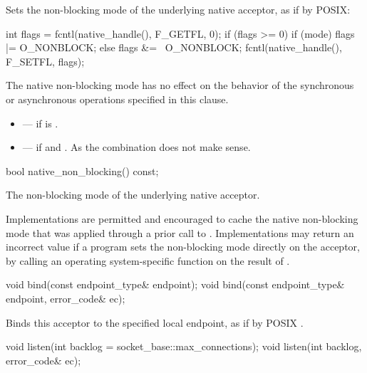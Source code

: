 \begin{itemdescr}
\pnum
\effects Sets the non-blocking mode of the underlying native acceptor, as if by POSIX: 
\begin{codeblock}
int flags = fcntl(native_handle(), F_GETFL, 0);
if (flags >= 0)
{
  if (mode)
    flags |= O_NONBLOCK;
  else
    flags &= ~O_NONBLOCK;
  fcntl(native_handle(), F_SETFL, flags);
}
\end{codeblock}


\pnum
 The native non-blocking mode has no effect on the behavior of the synchronous or asynchronous operations specified in this clause.

\pnum
\errors
\begin{itemize}
\item
{} --- if  is .
\item
{} --- if  and . \enternote As the combination does not make sense. \exitnote
\end{itemize}
\end{itemdescr}

\begin{itemdecl}
bool native_non_blocking() const;
\end{itemdecl}

\begin{itemdescr}
\pnum
\returns The non-blocking mode of the underlying native acceptor.

\pnum
\remarks Implementations are permitted and encouraged to cache the native non-blocking mode that was applied through a prior call to . Implementations may return an incorrect value if a program sets the non-blocking mode directly on the acceptor, by calling an operating system-specific function on the result of .
\end{itemdescr}

\begin{itemdecl}
void bind(const endpoint_type& endpoint);
void bind(const endpoint_type& endpoint, error_code& ec);
\end{itemdecl}

\begin{itemdescr}
\pnum
\effects Binds this acceptor to the specified local endpoint, as if by POSIX .
\end{itemdescr}

\begin{itemdecl}
void listen(int backlog = socket_base::max_connections);
void listen(int backlog, error_code& ec);
\end{itemdecl}

